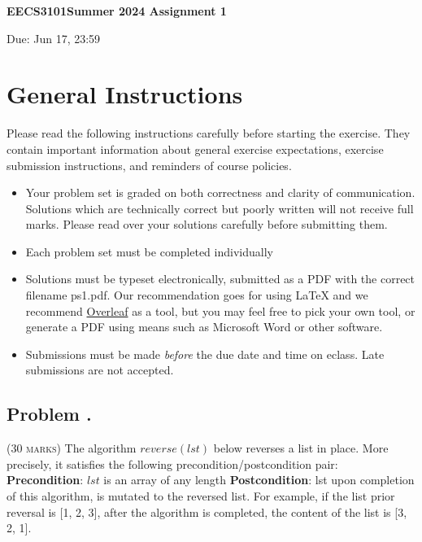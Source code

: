\documentclass[12pt]{article}
\newcounter{ProblemNum}
\renewcommand{\theProblemNum}{\arabic{ProblemNum}}
\newcommand*{\anyproblem}[1]{\newpage\subsection*{#1}}
\newcommand*{\problem}[1]{\stepcounter{ProblemNum} %
\anyproblem{Problem \theProblemNum. \; #1}}
\begin{document}
\begin{center}
\begin{Large}
  \textbf{EECS3101Summer 2024 Assignment 1 }\\
\end{Large}
\begin{large}
	Due: Jun 17, 23:59
\end{large}
\end{center}

\section*{General Instructions}
Please read the following instructions carefully before starting the exercise. They contain important
information about general exercise expectations, exercise submission instructions,
and reminders of course policies.

\begin{itemize}
\item Your problem set is graded on both correctness and clarity of communication. Solutions
which are technically correct but poorly written will not receive full marks. Please read over
your solutions carefully before submitting them.

\item Each problem set must be completed individually

\item Solutions must be typeset electronically, submitted as a PDF with the correct filename ps1.pdf. Our recommendation goes for using {\LaTeX}  and we recommend \href{https://www.overleaf.com/}{Overleaf} as a tool, but you may feel free to pick your own tool, or generate a PDF using means such as Microsoft Word or other software.


\item Submissions must be made \emph{before} the due date and time on eclass. Late submissions are not accepted.

\end{itemize}


\problem{}
\textsc{(30 marks)}
The algorithm $reverse(lst)$ below reverses a list in place. More precisely, it satisfies the following precondition/postcondition
pair:
\vskip5pt
{\bf Precondition}: $lst$ is an array of any length
\vskip2pt
{\bf Postcondition}: lst upon completion of this algorithm, is mutated to the reversed list. 
For example, if the list prior reversal is [1, 2, 3], after the algorithm is completed, the content of the list is [3, 2, 1].
\end{document}
